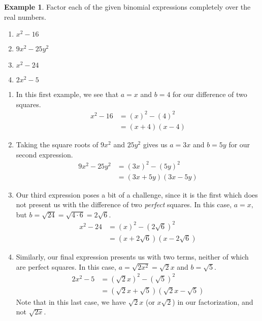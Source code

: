 \documentclass[12pt]{book}
\theoremstyle{definition}
\newtheorem{example}{Example}
\begin{document}
\begin{example}Factor each of the given binomial expressions completely over the real numbers.
	\begin{multicols}{4}
	\begin{enumerate}
		\item $x^2-16$
		\item $9x^2-25y^2$ 
		\item $x^2-24$
		\item $2x^2-5$
	\end{enumerate}
	\end{multicols}
	\begin{enumerate}
	\item In this first example, we see that $a=x$ and $b=4$ for our difference of two squares.
  \begin{equation*}
		\begin{split}
    x^2-16 &= \left(x\right)^2-\left(4\right)^2\\
					 &= \left(x+4\right)\left(x-4\right)
		\end{split}
	\end{equation*}
	\item Taking the square roots of $9x^2$ and $25y^2$ gives us $a=3x$ and $b=5y$ for our second expression.
	\begin{equation*}
		\begin{split}
    9x^2-25y^2 &= \left(3x\right)^2-\left(5y\right)^2\\
					 &= \left(3x+5y\right)\left(3x-5y\right)
		\end{split}
	\end{equation*}
	\item Our third expression poses a bit of a challenge, since it is the first which does not present us with the difference of two {\it perfect} squares.  In this case, $a=x,$ but $b=\sqrt{24}=\sqrt{4\cdot 6}=2\sqrt{6}$.
	\begin{equation*}
		\begin{split}
    x^2-24 &= \left(x\right)^2-\left(2\sqrt{6}\right)^2\\
					 &= \left(x+2\sqrt{6}\right)\left(x-2\sqrt{6}\right)
		\end{split}
	\end{equation*}
\newpage
	\item Similarly, our final expression presents us with two terms, neither of which are perfect squares.  In this case, $a=\sqrt{2x^2}=\sqrt{2}x$ and $b=\sqrt{5}$.
	\begin{equation*}
		\begin{split}
    2x^2-5 &= \left(\sqrt{2}x\right)^2-\left(\sqrt{5}\right)^2\\
					 &= \left(\sqrt{2}x+\sqrt{5}\right)\left(\sqrt{2}x-\sqrt{5}\right)
		\end{split}
	\end{equation*}
	Note that in this last case, we have $\sqrt{2}x$ (or $x\sqrt{2}$) in our factorization, and not $\sqrt{2x}$.
	\end{enumerate}
\end{example}
\end{document}

